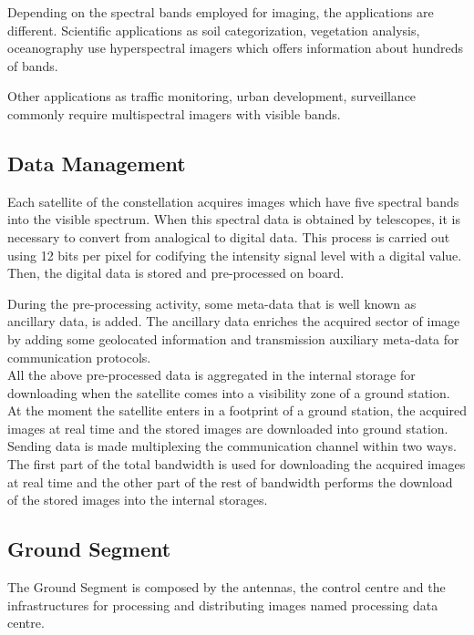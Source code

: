 Depending on the spectral bands employed for imaging, the applications are
different. Scientific applications as soil categorization, vegetation analysis,
oceanography use hyperspectral imagers which offers information about hundreds
of bands. 

Other applications as traffic monitoring, urban development,
surveillance commonly require multispectral imagers with visible bands.

\subsection{Data Management}

Each satellite of the constellation acquires images which have five spectral
bands into the visible spectrum. When this spectral data is
obtained by telescopes, it is necessary to convert from analogical to digital
data. This process is carried out using 12 bits per pixel for codifying the
intensity signal level with a digital value. Then, the digital data is stored and pre-processed on
board. 

During the pre-processing activity, some meta-data that is well known as ancillary
data, is added. The ancillary data enriches the acquired sector of image by adding
some geolocated information and transmission auxiliary meta-data for communication
protocols. \\All the above pre-processed data is aggregated in the
internal storage for downloading when the satellite comes into a visibility zone
of a ground station. At the moment the satellite enters in a footprint of a
ground station, the acquired images at real time and the stored images are
downloaded into ground station. \\Sending data is made multiplexing the
communication channel within two ways. The first part of the total bandwidth
is used for downloading the acquired images at real time and the other part of
the rest of bandwidth performs the download of the stored images into the
internal storages.

\subsection{Ground Segment}

The Ground Segment is composed by the antennas, the control centre and the
infrastructures for processing and distributing images named processing
data centre. 


